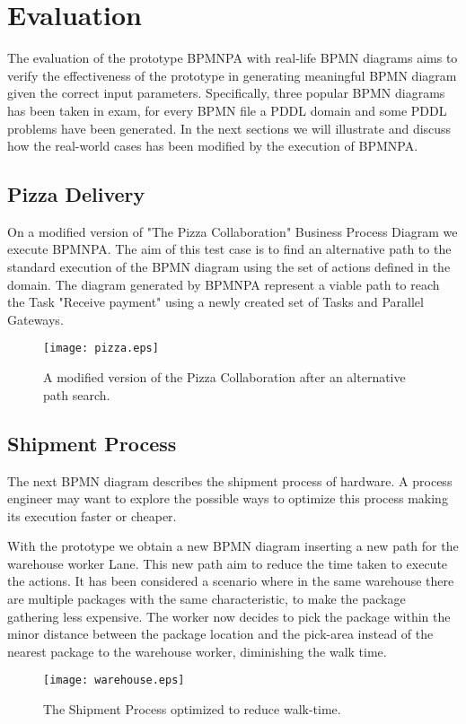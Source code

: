 
\chapter{Evaluation}
\label{cha:789}

The evaluation of the prototype BPMNPA with real-life BPMN diagrams aims to verify the effectiveness of the prototype in generating meaningful BPMN diagram given the correct input parameters.
Specifically, three popular BPMN diagrams has been taken in exam\cite{bpmn2examples}, for every BPMN file a PDDL domain and some PDDL problems have been generated.
In the next sections we will illustrate and discuss how the real-world cases has been modified by the execution of BPMNPA.

\section{Pizza Delivery}
\label{sec:456}
On a modified version of "The Pizza Collaboration" Business Process Diagram we execute BPMNPA. The aim of this test case is to find an alternative path to the standard execution of the BPMN diagram using the set of actions defined in the domain. The diagram generated by BPMNPA represent a viable path to reach the Task "Receive payment" using a newly created set of Tasks and Parallel Gateways.
\begin{center}
\begin{figure}[h!]
		\centerline{\texttt{[image: pizza.eps]}}
		\caption{A modified version of the Pizza Collaboration after an alternative path search.}
\end{figure}
\end{center}


\section{Shipment Process}
\label{sec:456}
The next BPMN diagram describes the shipment process of hardware. A process engineer may want to explore the possible ways to optimize this process making its execution faster or cheaper.

With the prototype we obtain a new BPMN diagram inserting a new path for the warehouse worker Lane. This new path aim to reduce the time taken to execute the actions. It has been considered a scenario where in the same warehouse there are multiple packages with the same characteristic, to make the package gathering less expensive. The worker now decides to pick the package within the minor distance between the package location and the pick-area instead of the nearest package to the warehouse worker, diminishing the walk time.
\begin{center}
\begin{figure}[h!]
		\centerline{\texttt{[image: warehouse.eps]}}
		\caption{The Shipment Process optimized to reduce walk-time.}
\end{figure}
\end{center}

